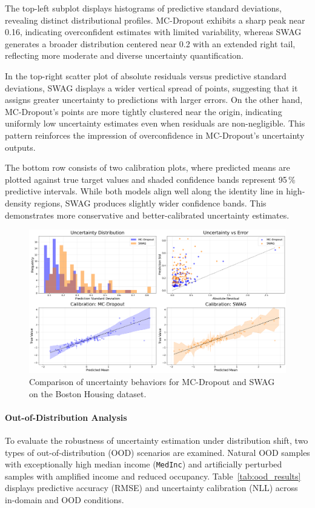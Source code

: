 The top-left subplot displays histograms of predictive standard deviations, revealing distinct
distributional profiles. MC-Dropout exhibits a sharp peak near 0.16, indicating overconfident estimates
with limited variability, whereas SWAG generates a broader distribution centered near 0.2 with an
extended right tail, reflecting more moderate and diverse uncertainty quantification.

In the top-right scatter plot of absolute residuals versus predictive standard deviations, SWAG displays a
wider vertical spread of points, suggesting that it assigns greater uncertainty to predictions with larger
errors. On the other hand, MC-Dropout's points are more tightly clustered near the origin, indicating
uniformly low uncertainty estimates even when residuals are non-negligible. This pattern reinforces the
impression of overconfidence in MC-Dropout's uncertainty outputs.

The bottom row consists of two calibration plots, where predicted means are plotted against true target
values and shaded confidence bands represent 95\,\% predictive intervals. While both models align well
along the identity line in high-density regions, SWAG produces slightly wider confidence bands. This
demonstrates more conservative and better-calibrated uncertainty estimates.

\FloatBarrier

\begin{figure}[ht]
    \centering
    \includegraphics[width=0.9\linewidth]{plots/bh_uncertainty_comp2x2.png}
    \caption{Comparison of uncertainty behaviors for MC-Dropout and SWAG on the Boston Housing dataset.}
    \label{fig:bh_uncertainty_comp2x2}
\end{figure}

\FloatBarrier


\paragraph{Out-of-Distribution Analysis}
To evaluate the robustness of uncertainty estimation under distribution shift, two types of
out-of-distribution (OOD) scenarios are examined. Natural OOD samples with exceptionally high median
income (\texttt{MedInc}) and artificially perturbed samples with amplified income and reduced occupancy.
Table~\ref{tab:ood_results} displays predictive accuracy (RMSE) and uncertainty calibration (NLL) across
in-domain and OOD conditions.

